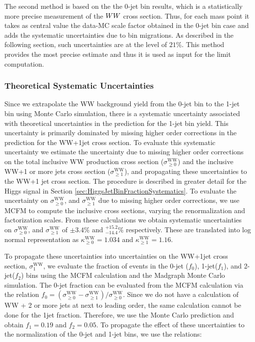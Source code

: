 The second method is based on the the 0-jet bin results, which is a statistically 
more precise measurement of the $WW$ cross section. 
Thus, for each mass point it takes as central value the data-MC scale factor obtained in the 0-jet bin case and adds the 
systematic uncertainties due to bin migrations. 
As described in the following section, such uncertainties are at the level of $21\%$.
This method provides the most precise estimate and thus it is used as input for the limit computation.


\subsubsection{Theoretical Systematic Uncertainties} 
Since we extrapolate the WW background yield from the 0-jet bin to the 1-jet bin using Monte Carlo
simulation, there is a systematic uncertainty associated with theoretical uncertainties in
the prediction for the 1-jet bin yield. This uncertainty is primarily dominated by missing higher
order corrections in the prediction for the WW+1jet cross section. To evaluate this systematic 
uncertainty we estimate the uncertainty due to missing higher order corrections on the
total inclusive WW production cross section ($\sigma^{\mathrm{WW}}_{\geq 0}$) and the inclusive 
WW+1 or more jets cross section ($\sigma^{\mathrm{WW}}_{\geq 1}$), and propagating these uncertainties 
to the WW+1 jet cross section. The procedure is described in greater detail for the Higgs signal
in Section \ref{sec:HiggsJetBinFractionSystematics}. To evaluate the uncertainty on 
$\sigma^{\mathrm{WW}}_{\geq 0}$, and $\sigma^{\mathrm{WW}}_{\geq 1}$ due to missing higher 
order corrections, we use MCFM \cite{MCFMVVProduction} to compute the inclusive cross sections, 
varying the renormalization and factorization scales. From these calculations we obtain 
systematic uncertainties on $\sigma^{\mathrm{WW}}_{\geq 0}$, and 
$\sigma^{\mathrm{WW}}_{\geq 1}$ of $\pm 3.4\%$ and $^{+15.2}_{-14.4} \%$ respectively. These are translated into
log normal representation as $\kappa^{\mathrm{WW}}_{\geq 0} = 1.034$ and $\kappa^{\mathrm{WW}}_{\geq 1} = 1.16$.

To propagate these uncertainties into uncertainties on the WW+1jet cross section, $\sigma^{\mathrm{WW}}_{1}$,
we evaluate the fraction of events in the 0-jet ($f_{0}$), 1-jet($f_{1}$), and 2-jet($f_{2}$) 
bins using the MCFM calculation and the Madgraph Monte Carlo simulation. The 0-jet fraction can be 
evaluated from the MCFM calculation via the relation 
$f_{0} = (\sigma^{\mathrm{WW}}_{\geq 0} - \sigma^{\mathrm{WW}}_{\geq 1}) / \sigma^{\mathrm{WW}}_{\geq 0}$.
Since we do not have a calculation of WW + 2 or more jets at next to leading order, the same calculation 
cannot be done for the  1jet fraction. Therefore, we use the Monte Carlo prediction and obtain 
$f_{1} = 0.19$ and $f_{2} = 0.05$. To propagate the effect of these uncertainties to the 
normalization of the 0-jet and 1-jet bins, we use the relations:

